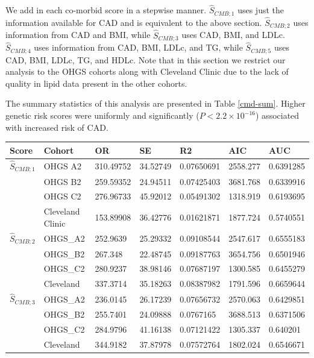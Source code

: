 We add in each co-morbid score in a stepwise manner. $\hat{S}_{CMB; 1}$ uses just the information available for CAD and is equivalent to the above section.  $\hat{S}_{CMB; 2}$ uses information from CAD and BMI, while $\hat{S}_{CMB; 3}$ uses CAD, BMI, and LDLc. $\hat{S}_{CMB; 4}$ uses information from CAD, BMI, LDLc, and TG, while $\hat{S}_{CMB; 5}$ uses CAD, BMI, LDLc, TG, and HDLc. Note that in this section we restrict our analysis to the \ac{OHGS} cohorts along with Cleveland Clinic due to the lack of quality in lipid data present in the other cohorts. 

The summary statistics of this analysis are presented in Table \ref{cmd-sum}. Higher genetic risk scores were uniformly and significantly ($P < 2.2 \times 10^{-16}$) associated with increased risk of \ac{CAD}.

\begin{table}[H]
\centering
\begin{tabular}{lllllll}
\hline
Score & Cohort           & OR        & SE       & R2         & AIC      & AUC       \\ \hline
$\hat{S}_{CMB; 1}$     & OHGS A2          & 310.49752 & 34.52749 & 0.07650691 & 2558.277 & 0.6391285 \\
      & OHGS B2          & 259.59352 & 24.94511 & 0.07425403 & 3681.768 & 0.6339916 \\
      & OHGS C2          & 276.96733 & 45.92012 & 0.05491302 & 1318.919 & 0.6193695 \\
      & Cleveland Clinic & 153.89908 & 36.42776 & 0.01621871 & 1877.724 & 0.5740551 \\ \hline
$\hat{S}_{CMB; 2}$     & OHGS\_A2         & 252.9639  & 25.29332 & 0.09108544 & 2547.617 & 0.6555183 \\
      & OHGS\_B2         & 267.348   & 22.48745 & 0.09187763 & 3654.756 & 0.6501946 \\
      & OHGS\_C2         & 280.9237  & 38.98146 & 0.07687197 & 1300.585 & 0.6455279 \\
      & Cleveland        & 337.3714  & 35.18263 & 0.08387982 & 1791.596 & 0.6659644 \\ \hline
$\hat{S}_{CMB; 3}$     & OHGS\_A2         & 236.0145  & 26.17239 & 0.07656732 & 2570.063 & 0.6429851 \\
      & OHGS\_B2         & 255.7401  & 24.09888 & 0.0767165  & 3688.513 & 0.6371506 \\
      & OHGS\_C2         & 284.9796  & 41.16138 & 0.07121422 & 1305.337 & 0.640201  \\
      & Cleveland        & 344.9182  & 37.87978 & 0.07572764 & 1802.024 & 0.6546671 \\ \hline

\end{tabular}
\end{table}
